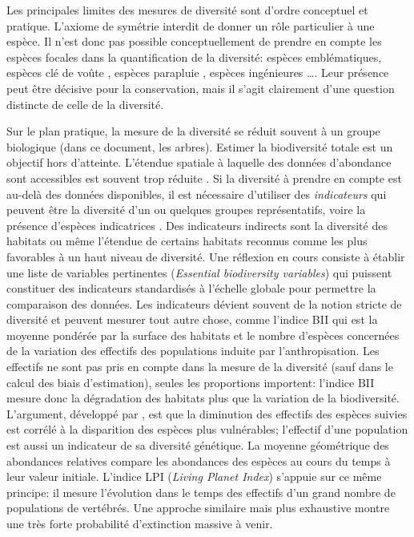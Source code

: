 \documentclass[
  11pt,
  french,
  a4paper,
  extrafontsizes,onecolumn,openright
  ]{memoir}
\newlength{\rf}
\begin{document}
Les principales limites des mesures de diversité sont d'ordre conceptuel et pratique.
L'axiome de symétrie interdit de donner un rôle particulier à une espèce.
Il n'est donc pas possible conceptuellement de prendre en compte les espèces focales \autocite{Zacharias2001} dans la quantification de la diversité: espèces emblématiques, espèces clé de voûte \autocite{Paine1969}, espèces parapluie \autocite{Roberge2004}, espèces ingénieures \autocite{Jones1994}\ldots.
Leur présence peut être décisive pour la conservation, mais il s'agit clairement d'une question distincte de celle de la diversité.

Sur le plan pratique, la mesure de la diversité se réduit souvent à un groupe biologique (dans ce document, les arbres).
Estimer la biodiversité totale est un objectif hors d'atteinte.
L'étendue spatiale à laquelle des données d'abondance sont accessibles est souvent trop réduite \autocite{Chiarucci2011}.
Si la diversité à prendre en compte est au-delà des données disponibles, il est nécessaire d'utiliser des \emph{indicateurs} \autocite{Balmford2003} qui peuvent être la diversité d'un ou quelques groupes représentatifs, voire la présence d'espèces indicatrices \autocite{Clements1916}.
Des indicateurs indirects sont la diversité des habitats ou même l'étendue de certains habitats reconnus comme les plus favorables à un haut niveau de diversité.
Une réflexion en cours \autocite{Pereira2013} consiste à établir une liste de variables pertinentes (\emph{Essential biodiversity variables}) qui puissent constituer des indicateurs standardisés à l'échelle globale pour permettre la comparaison des données.
Les indicateurs dévient souvent de la notion stricte de diversité et peuvent mesurer tout autre chose, comme l'indice BII \autocite[\emph{Biodiversity Intactness Index},][]{Scholes2005} qui est la moyenne pondérée par la surface des habitats et le nombre d'espèces concernées de la variation des effectifs des populations induite par l'anthropisation.
Les effectifs ne sont pas pris en compte dans la mesure de la diversité (sauf dans le calcul des biais d'estimation), seules les proportions importent: l'indice BII mesure donc la dégradation des habitats plus que la variation de la biodiversité.
L'argument, développé par \textcite{Balmford2003}, est que la diminution des effectifs des espèces suivies est corrélé à la disparition des espèces plus vulnérables; l'effectif d'une population est aussi un indicateur de sa diversité génétique.
La moyenne géométrique des abondances relatives \autocite{Buckland2011} compare les abondances des espèces au cours du temps à leur valeur initiale.
L'indice LPI (\emph{Living Planet Index}) \autocite{Loh2005} s'appuie sur ce même principe: il mesure l'évolution dans le temps des effectifs d'un grand nombre de populations de vertébrés.
Une approche similaire mais plus exhaustive \autocite{Ceballos2017} montre une très forte probabilité d'extinction massive à venir.
\end{document}
